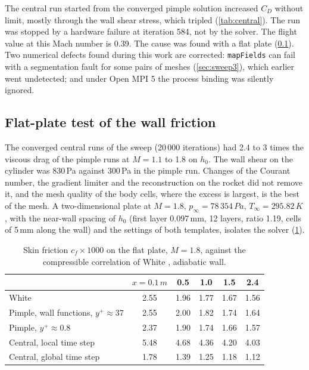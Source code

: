 \documentclass[11pt,a4paper]{article}
\newcommand{\unit}[2]{#1\,#2}
\begin{document}
The central run started from the converged pimple solution increased $C_D$ without
limit, mostly through the wall shear stress, which tripled (\cref{tab:central}). The run
was stopped by a hardware failure at iteration 584, not by the solver. The flight value
at this Mach number is 0.39. The cause was found with a flat plate (\cref{sec:flatplate}). Two numerical defects found during this work are corrected: \texttt{mapFields}
can fail with a segmentation fault for some pairs of meshes (\cref{sec:sweep3}), which
earlier went undetected; and under Open MPI 5 the process binding was silently ignored.

\subsection{Flat-plate test of the wall friction}\label{sec:flatplate}

The converged central runs of the sweep (20\,000 iterations) had 2.4 to 3 times the
viscous drag of the pimple runs at $M = 1.1$ to 1.8 on $h_0$. The wall shear on the
cylinder was \unit{830}{Pa} against \unit{300}{Pa} in the pimple run. Changes of the
Courant number, the gradient limiter and the reconstruction on the rocket did not remove
it, and the mesh quality of the body cells, where the excess is largest, is the best of
the mesh. A two-dimensional plate at $M = 1.8$, $p_\infty = \unit{78\,354}{Pa}$,
$T_\infty = \unit{295.82}{K}$, with the near-wall spacing of $h_0$ (first layer
\unit{0.097}{mm}, 12 layers, ratio 1.19, cells of \unit{5}{mm} along the wall) and the
settings of both templates, isolates the solver (\cref{tab:flatplate}).

\begin{table}[htbp]
\centering
\caption{Skin friction $c_f \times 1000$ on the flat plate, $M = 1.8$, against the
compressible correlation of White \citep[§7]{white2006}, adiabatic wall.}\label{tab:flatplate}
\begin{tabular}{@{}lccccc@{}}
\toprule
 & $x = \unit{0.1}{m}$ & 0.5 & 1.0 & 1.5 & 2.4 \\
\midrule
White & 2.55 & 1.96 & 1.77 & 1.67 & 1.56 \\
Pimple, wall functions, $y^+ \approx 37$ & 2.55 & 2.00 & 1.82 & 1.74 & 1.64 \\
Pimple, $y^+ \approx 0.8$ & 2.37 & 1.90 & 1.74 & 1.66 & 1.57 \\
Central, local time step & 5.48 & 4.68 & 4.36 & 4.20 & 4.03 \\
Central, global time step & 1.78 & 1.39 & 1.25 & 1.18 & 1.12 \\
\bottomrule
\end{tabular}
\end{table}
\end{document}
